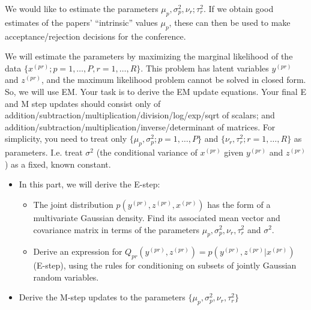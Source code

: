 \documentclass{article}
\theoremstyle{definition}
\theoremstyle{definition}
\theoremstyle{remark}
\begin{document}
We would like to estimate the parameters $\mu_p, \sigma_p^2, \nu_r; \tau_r^2$. If we obtain good estimates of
the papers' ``intrinsic'' values $\mu_p$, these can then be used to make acceptance/rejection
decisions for the conference.

We will estimate the parameters by maximizing the marginal likelihood of the data $\{x^{(pr)}; p =
1, \ldots, P, r = 1, \ldots, R\}$. This problem has latent variables $y^{(pr)}$ and $z^{(pr)}$, and the maximum likelihood problem cannot be solved in closed form. So, we will use EM. Your
task is to derive the EM update equations. Your final E and M step updates should
consist only of addition/subtraction/multiplication/division/log/exp/sqrt of scalars; and
addition/subtraction/multiplication/inverse/determinant of matrices. For simplicity, you
need to treat only $\{\mu_p, \sigma_p^2; p = 1, \ldots, P\}$ and $\{\nu_r, \tau_r^2; r = 1, \ldots, R\}$ as parameters. I.e. treat
$\sigma^2$ (the conditional variance of $x^{(pr)}$ given $y^{(pr)}$ and $z^{(pr)}$) as a fixed, known constant.

\begin{itemize}
  \item In this part, we will derive the E-step:
    \begin{itemize}
      \item The joint distribution $p(y^{(pr)}, z^{(pr)}, x^{(pr)})$ has the form of a multivariate Gaussian
density. Find its associated mean vector and covariance matrix in terms of the parameters $\mu_p, \sigma_p^2, \nu_r, \tau_r^2$ and $\sigma^2$.
      \item Derive an expression for $Q_{pr}(y^{(pr)}, z^{(pr)}) = p(y^{(pr)}, z^{(pr)}|x^{(pr)})$ (E-step), using the
rules for conditioning on subsets of jointly Gaussian random variables.
    \end{itemize}
  \item Derive the M-step updates to the parameters $\{\mu_p, \sigma_p^2, \nu_r, \tau_r^2\}$
\end{itemize}
\end{document}
